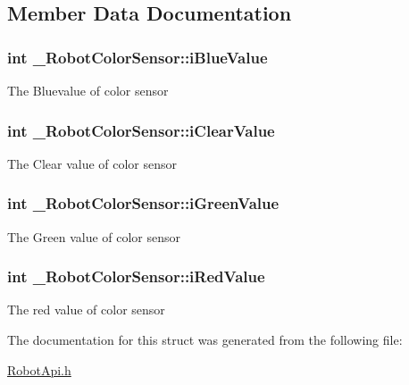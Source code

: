 \subsection{Member Data Documentation}
\hypertarget{struct__RobotColorSensor_ad5c72e4e33a2447d6514d1d5a13dc036}{
\subsubsection[{i\-Blue\-Value}]{\setlength{\rightskip}{0pt plus 5cm}int \-\_\-\-Robot\-Color\-Sensor\-::i\-Blue\-Value}}\label{struct__RobotColorSensor_ad5c72e4e33a2447d6514d1d5a13dc036}
The Bluevalue of color sensor \hypertarget{struct__RobotColorSensor_afc18a2ae43409d1b74340f6f9d9fb677}{
\subsubsection[{i\-Clear\-Value}]{\setlength{\rightskip}{0pt plus 5cm}int \-\_\-\-Robot\-Color\-Sensor\-::i\-Clear\-Value}}\label{struct__RobotColorSensor_afc18a2ae43409d1b74340f6f9d9fb677}
The Clear value of color sensor \hypertarget{struct__RobotColorSensor_acfeb66d972f8c3ab2a5982fd4aa3f630}{
\subsubsection[{i\-Green\-Value}]{\setlength{\rightskip}{0pt plus 5cm}int \-\_\-\-Robot\-Color\-Sensor\-::i\-Green\-Value}}\label{struct__RobotColorSensor_acfeb66d972f8c3ab2a5982fd4aa3f630}
The Green value of color sensor \hypertarget{struct__RobotColorSensor_a38b270be1ee87849b7469d100e335314}{
\subsubsection[{i\-Red\-Value}]{\setlength{\rightskip}{0pt plus 5cm}int \-\_\-\-Robot\-Color\-Sensor\-::i\-Red\-Value}}\label{struct__RobotColorSensor_a38b270be1ee87849b7469d100e335314}
The red value of color sensor 

The documentation for this struct was generated from the following file\-:\begin{DoxyCompactItemize}
\item 
\hyperlink{RobotApi_8h}{Robot\-Api.\-h}\end{DoxyCompactItemize}
